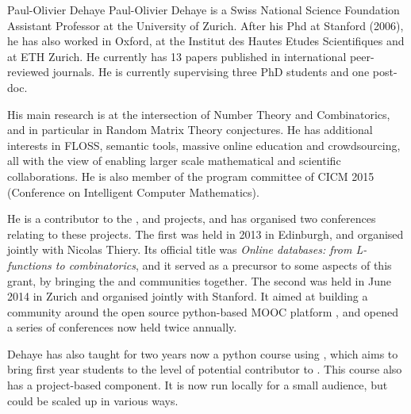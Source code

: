 \begin{picv}[type=leadPI,PM=6]{Paul-Olivier Dehaye}
  Paul-Olivier Dehaye is a Swiss National Science Foundation Assistant Professor at the
  University of Zurich. After his Phd at Stanford (2006), he has also worked in Oxford, at
  the Institut des Hautes Etudes Scientifiques and at ETH Zurich. He currently has 13
  papers published in international peer-reviewed journals. He is currently supervising
  three PhD students and one post-doc.

  His main research is at the intersection of Number Theory and Combinatorics, and in
  particular in Random Matrix Theory conjectures. He has additional interests in FLOSS,
  semantic tools, massive online education and crowdsourcing, all with the view of
  enabling larger scale mathematical and scientific collaborations. He is also member of
  the program committee of CICM 2015 (Conference on Intelligent Computer Mathematics).

  He is a contributor to the \Sage, \LMFDB and \OpenEdX projects, and has organised two
  conferences relating to these projects. The first was held in 2013 in Edinburgh, and
  organised jointly with Nicolas Thiery. Its official title was \emph{Online databases:
    from L-functions to combinatorics}, and it served as a precursor to some aspects of
  this grant, by bringing the \SageCombinat and \LMFDB communities together.  The second
  was held in June 2014 in Zurich and organised jointly with Stanford. It aimed at
  building a community around the open source python-based MOOC platform \OpenEdX, and
  opened a series of conferences now held twice annually.

  Dehaye has also taught for two years now a python course using \OpenEdX, which aims to
  bring first year students to the level of potential contributor to \Sage. This course
  also has a project-based component. It is now run locally for a small audience, but
  could be scaled up in various ways.
\end{picv}


